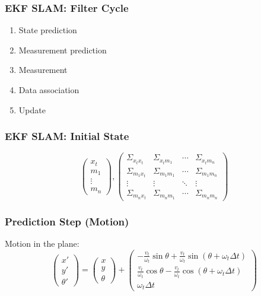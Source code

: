 \begin{frame}
    \frametitle{EKF SLAM: Filter Cycle}
    \begin{enumerate}
    \item State prediction
    \item Measurement prediction
    \item Measurement
    \item Data association
    \item Update
    \end{enumerate}
\end{frame}

\begin{frame}
    \frametitle{EKF SLAM: Initial State}
    \[
    \begin{pmatrix}
    x_t \\
    m_1 \\
    \vdots \\
    m_n
    \end{pmatrix},
    \begin{pmatrix}
    \Sigma_{x_t x_t} & \Sigma_{x_t m_1} & \cdots & \Sigma_{x_t m_n} \\
    \Sigma_{m_1 x_t} & \Sigma_{m_1 m_1} & \cdots & \Sigma_{m_1 m_n} \\
    \vdots & \vdots & \ddots & \vdots \\
    \Sigma_{m_n x_t} & \Sigma_{m_n m_1} & \cdots & \Sigma_{m_n m_n}
    \end{pmatrix}
    \]
\end{frame}

\begin{frame}
    \frametitle{Prediction Step (Motion)}

    Motion in the plane:
    \[
    \begin{pmatrix} x' \\ y' \\ \theta' \end{pmatrix} = 
    \begin{pmatrix} x \\ y \\ \theta \end{pmatrix} + 
    \begin{pmatrix} 
    -\frac{v_t}{\omega_t} \sin \theta + \frac{v_t}{\omega_t} \sin (\theta + \omega_t \Delta t) \\ 
    \frac{v_t}{\omega_t} \cos \theta - \frac{v_t}{\omega_t} \cos (\theta + \omega_t \Delta t) \\ 
    \omega_t \Delta t 
    \end{pmatrix}
    \]
\end{frame}

